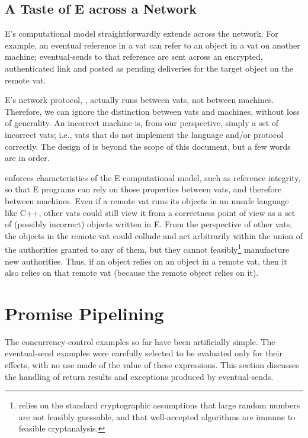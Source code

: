 \documentclass{llncs}
\begin{document}
\subsection{A Taste of E across a Network}

E's computational model straightforwardly extends across the network.
For example, an eventual reference in a vat can refer to an object in
a vat on another machine; eventual-sends to that reference are sent
across an encrypted, authenticated link and posted as pending
deliveries for the target object on the remote vat.

E's network protocol, , actually runs between vats, not
between machines. Therefore, we can ignore the distinction between
vats and machines, without loss of generality. An incorrect machine
is, from our perspective, simply a set of incorrect vats; i.e., vats
that do not implement the language and/or protocol correctly. The
design of  is beyond the scope of this document, but a
few words are in order.

 enforces characteristics of the E computational model,
such as reference integrity, so that E programs can rely on those
properties between vats, and therefore between machines. Even if a
remote vat runs its objects in an unsafe language like C++, other vats
could still view it from a correctness point of view as a set of
(possibly incorrect) objects written in E. From the perspective of
other vats, the objects in the remote vat could collude and act
arbitrarily within the union of the authorities granted to any of
them, but they cannot feasibly\footnote{
%
 relies on the standard cryptographic assumptions that
large random numbers are not feasibly guessable, and that
well-accepted algorithms are immune to feasible cryptanalysis.}
%
manufacture new authorities. Thus, if an object relies on an object in
a remote vat, then it also relies on that remote vat (because the
remote object relies on it).

\section{Promise Pipelining}

The concurrency-control examples so far have been artificially
simple. The eventual-send examples were carefully selected to be
evaluated only for their effects, with no use made of the value of
these expressions. This section discusses the handling of return
results and exceptions produced by eventual-sends.
\end{document}
